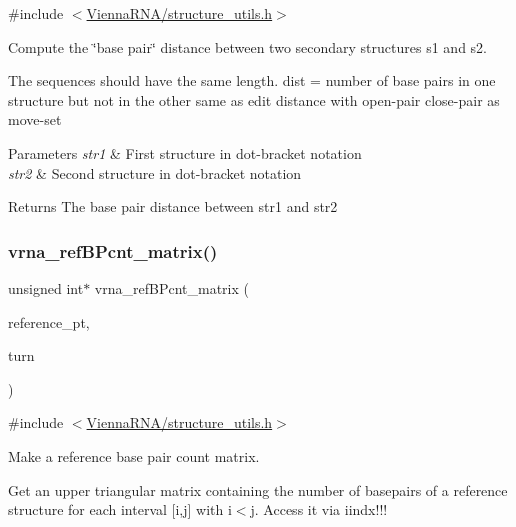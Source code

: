 {\ttfamily \#include $<$\mbox{\hyperlink{structure__utils_8h}{Vienna\+R\+N\+A/structure\+\_\+utils.\+h}}$>$}



Compute the \char`\"{}base pair\char`\"{} distance between two secondary structures s1 and s2. 

The sequences should have the same length. dist = number of base pairs in one structure but not in the other same as edit distance with open-\/pair close-\/pair as move-\/set


\begin{DoxyParams}{Parameters}
{\em str1} & First structure in dot-\/bracket notation \\
\hline
{\em str2} & Second structure in dot-\/bracket notation \\
\hline
\end{DoxyParams}
\begin{DoxyReturn}{Returns}
The base pair distance between str1 and str2 
\end{DoxyReturn}
\mbox{\label{group__struct__utils_gab4c2a00c99ce1d612ffa5bde114eb96d}} 
\subsubsection{\texorpdfstring{vrna\+\_\+ref\+B\+Pcnt\+\_\+matrix()}{vrna\_refBPcnt\_matrix()}}
{\footnotesize\ttfamily unsigned int$\ast$ vrna\+\_\+ref\+B\+Pcnt\+\_\+matrix (\begin{DoxyParamCaption}\item[{const short $\ast$}]{reference\+\_\+pt,  }\item[{unsigned int}]{turn }\end{DoxyParamCaption})}



{\ttfamily \#include $<$\mbox{\hyperlink{structure__utils_8h}{Vienna\+R\+N\+A/structure\+\_\+utils.\+h}}$>$}



Make a reference base pair count matrix. 

Get an upper triangular matrix containing the number of basepairs of a reference structure for each interval \mbox{[}i,j\mbox{]} with i$<$j. Access it via iindx!!! \mbox{\label{group__struct__utils_ga5a27bd058183170afd4716f5b8ff511a}} 
